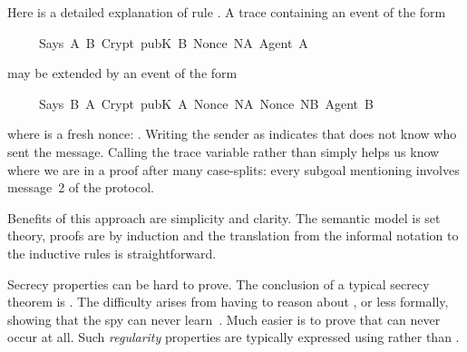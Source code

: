 \begin{isabellebody}
\begin{isamarkuptext}
Here is a detailed explanation of rule .
A trace containing an event of the form
\begin{isabelle}%
\ \ \ \ \ Says\ A{\isacharprime}\ B\ {\isacharparenleft}Crypt\ {\isacharparenleft}pubK\ B{\isacharparenright}\ {\isasymlbrace}Nonce\ NA{\isacharcomma}\ Agent\ A{\isasymrbrace}{\isacharparenright}%
\end{isabelle}
may be extended by an event of the form
\begin{isabelle}%
\ \ \ \ \ Says\ B\ A\ {\isacharparenleft}Crypt\ {\isacharparenleft}pubK\ A{\isacharparenright}\ {\isasymlbrace}Nonce\ NA{\isacharcomma}\ Nonce\ NB{\isacharcomma}\ Agent\ B{\isasymrbrace}{\isacharparenright}%
\end{isabelle}
where  is a fresh nonce: .
Writing the sender as  indicates that  does not 
know who sent the message.  Calling the trace variable  rather
than simply  helps us know where we are in a proof after many
case-splits: every subgoal mentioning  involves message~2 of the
protocol.

Benefits of this approach are simplicity and clarity.  The semantic model
is set theory, proofs are by induction and the translation from the informal
notation to the inductive rules is straightforward.%
\end{isamarkuptext}%
\isamarkuptrue%
%
\isamarkuptrue%
%
\isadelimproof
%
\endisadelimproof
%
\isatagproof
%
\endisatagproof
{\isafoldproof}%
%
\isadelimproof
%
\endisadelimproof
%
\begin{isamarkuptext}%
Secrecy properties can be hard to prove.  The conclusion of a typical
secrecy theorem is 
.  The difficulty arises from
having to reason about , or less formally, showing that the spy
can never learn~.  Much easier is to prove that  can never
occur at all.  Such \emph{regularity} properties are typically expressed
using  rather than .


\end{isamarkuptext}
\end{isabellebody}
